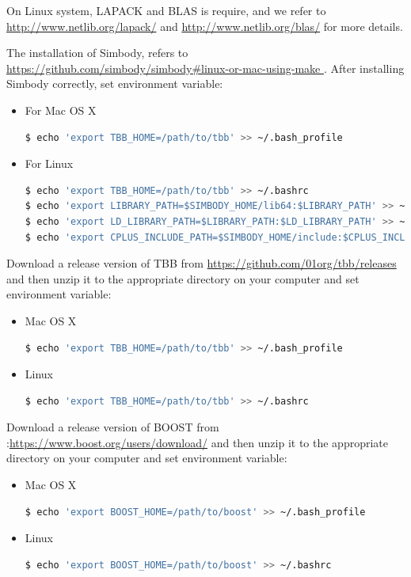 \documentclass[12pt, a4paper,onecolumn]{article}
\begin{document}
On Linux system, LAPACK and BLAS is require, and we refer to \url{http://www.netlib.org/lapack/} and \url{http://www.netlib.org/blas/} for more details.

The installation of Simbody, refers to \url{https://github.com/simbody/simbody#linux-or-mac-using-make }.
After installing Simbody correctly, set environment variable:
\begin{itemize}
\item  For Mac OS X
\begin{lstlisting}[language=Bash]
$ echo 'export TBB_HOME=/path/to/tbb' >> ~/.bash_profile
\end{lstlisting}
\item  For Linux
\begin{lstlisting}[language=Bash]
$ echo 'export TBB_HOME=/path/to/tbb' >> ~/.bashrc
$ echo 'export LIBRARY_PATH=$SIMBODY_HOME/lib64:$LIBRARY_PATH' >> ~/.bashrc
$ echo 'export LD_LIBRARY_PATH=$LIBRARY_PATH:$LD_LIBRARY_PATH' >> ~/.bashrc
$ echo 'export CPLUS_INCLUDE_PATH=$SIMBODY_HOME/include:$CPLUS_INCLUDE_PATH' << ~/.bashrc
\end{lstlisting} 
\end{itemize}

Download a release version of TBB from \url{https://github.com/01org/tbb/releases} and then unzip it to the appropriate directory on your computer and set environment variable:
\begin{itemize}
\item Mac OS X
\begin{lstlisting}[language=Bash]
$ echo 'export TBB_HOME=/path/to/tbb' >> ~/.bash_profile
\end{lstlisting}
\item Linux
\begin{lstlisting}[language=Bash]
$ echo 'export TBB_HOME=/path/to/tbb' >> ~/.bashrc
\end{lstlisting}
\end{itemize}
Download a release version of BOOST from :\url{https://www.boost.org/users/download/} and then unzip it to the appropriate directory on your computer and set environment variable:
\begin{itemize}
\item Mac OS X
\begin{lstlisting}[language=Bash]
$ echo 'export BOOST_HOME=/path/to/boost' >> ~/.bash_profile
\end{lstlisting}
\item  Linux
\begin{lstlisting}[language=Bash]
$ echo 'export BOOST_HOME=/path/to/boost' >> ~/.bashrc
\end{lstlisting}
\end{itemize}
\end{document}
